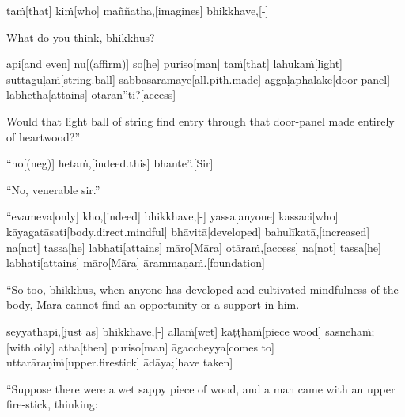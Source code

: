 \begin{samepage}
\begingl[glneveryline={\PaliGlossA,\PaliGlossB}]
taṁ[that] kiṁ[who] maññatha,[imagines] bhikkhave,[-]
\endgl
\nopagebreak
\linespread{0.5}
\begin{spacin}{0.2}
{\PaliGlossFT What do you think, bhikkhus?}
\end{spacin}
\vskip 12pt
\end{samepage}
\begin{samepage}
\begingl[glneveryline={\PaliGlossA,\PaliGlossB}]
api[and even] nu[(affirm)] so[he] puriso[man] taṁ[that] lahukaṁ[light] suttaguḷaṁ[string.ball] sabbasāramaye[all.pith.made] aggaḷaphalake[door panel] labhetha[attains] otāran”ti?[access]
\endgl
\nopagebreak
\linespread{0.5}
\begin{spacin}{0.2}
{\PaliGlossFT Would that light ball of string find entry through that door-panel made entirely of heartwood?”}
\end{spacin}
\vskip 12pt
\end{samepage}
\begin{samepage}
\begingl[glneveryline={\PaliGlossA,\PaliGlossB}]
“no[(neg)] hetaṁ,[indeed.this] bhante”.[Sir]
\endgl
\nopagebreak
\linespread{0.5}
\begin{spacin}{0.2}
{\PaliGlossFT “No, venerable sir.”}
\end{spacin}
\vskip 12pt
\end{samepage}
\begin{samepage}
\begingl[glneveryline={\PaliGlossA,\PaliGlossB}]
“evameva[only] kho,[indeed] bhikkhave,[-] yassa[anyone] kassaci[who] kāyagatāsati[body.direct.mindful] bhāvitā[developed] bahulīkatā,[increased] na[not] tassa[he] labhati[attains] māro[Māra] otāraṁ,[access] na[not] tassa[he] labhati[attains] māro[Māra] ārammaṇaṁ.[foundation]
\endgl
\nopagebreak
\linespread{0.5}
\begin{spacin}{0.2}
{\PaliGlossFT “So too, bhikkhus, when anyone has developed and cultivated mindfulness of the body, Māra cannot find an opportunity or a support in him.}
\end{spacin}
\vskip 12pt
\end{samepage}
\begin{samepage}
\begingl[glneveryline={\PaliGlossA,\PaliGlossB}]
seyyathāpi,[just as] bhikkhave,[-] allaṁ[wet] kaṭṭhaṁ[piece wood] sasnehaṁ;[with.oily] atha[then] puriso[man] āgaccheyya[comes to] uttarāraṇiṁ[upper.firestick] ādāya;[have taken]
\endgl
\nopagebreak
\linespread{0.5}
\begin{spacin}{0.2}
{\PaliGlossFT “Suppose there were a wet sappy piece of wood, and a man came with an upper fire-stick, thinking:}
\end{spacin}
\vskip 12pt
\end{samepage}

